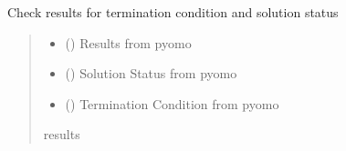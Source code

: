 \documentclass[letterpaper,10pt,english]{sphinxmanual}
\begin{document}
\begin{fulllineitems}
\label{\detokenize{src.models.electricity.scripts.utilities:src.models.electricity.scripts.utilities.check_results}}
\pysigstartsignatures
\pysiglinewithargsret
{}
{\sphinxparamcomma {}\sphinxparamcomma {}}
{}
\pysigstopsignatures
\sphinxAtStartPar
Check results for termination condition and solution status
\begin{quote}\begin{description}
\begin{itemize}
\item {} 
\sphinxAtStartPar
{} () \textendash{} Results from pyomo

\item {} 
\sphinxAtStartPar
{} () \textendash{} Solution Status from pyomo

\item {} 
\sphinxAtStartPar
{} () \textendash{} Termination Condition from pyomo

\end{itemize}

\sphinxAtStartPar
results

\end{description}\end{quote}

\end{fulllineitems}

\end{document}
